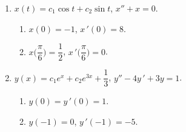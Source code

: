 \documentclass[letterpaper,10pt]{memoir}
\begin{document}
\begin{enumerate}
		\begin{enumerate}
			\item \(x(t) =c_1 \cos t+c_2 \sin t\), \(x '' +x=0\).
				\begin{enumerate}
					\item \(x(0) =-1\), \(x \,' (0) =8\).
					\item \(x \Big(\dfrac \pi 6\Big) = \dfrac{1}{2}\), \(x \,' \Big(\dfrac{\pi}{6}\Big) =0\).
				\end{enumerate}
			\item \(y(x) =c_1e^x+c_2e^{3x} + \dfrac{1}{3}\), \(y '' -4y \,' +3y=1\).
				\begin{enumerate}
					\item \(y(0) =y \,' (0) =1\).
					\item \(y(-1) =0\), \(y \,' (-1) =-5\).
				\end{enumerate}
		\end{enumerate}
\end{enumerate}
\end{document}
